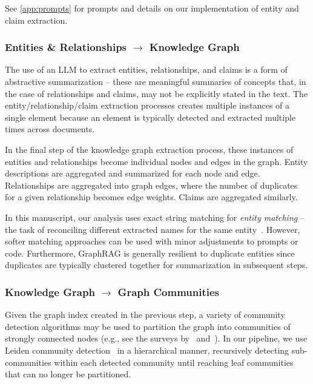 \documentclass{article}
\begin{document}
See \autoref{app:prompts} for prompts and details on our implementation of entity and claim extraction.

\subsubsection{Entities \& Relationships \texorpdfstring{$\rightarrow$}{-->} Knowledge Graph}
The use of an LLM to extract entities, relationships, and claims is a form of abstractive summarization -- these are meaningful summaries of concepts that, in the case of relationships and claims, may not be explicitly stated in the text.
The entity/relationship/claim extraction processes creates multiple instances of a single element because an element is typically detected and extracted multiple times across documents.

In the final step of the knowledge graph extraction process, these instances of entities and relationships become individual nodes and edges in the graph.
Entity descriptions are aggregated and summarized for each node and edge.
Relationships are aggregated into graph edges, where the number of duplicates for a given relationship becomes edge weights.
Claims are aggregated similarly.

In this manuscript, our analysis uses exact string matching for \emph{entity matching} -- the task of reconciling different extracted names for the same entity~\citep{barlaug2021neural, christen2012data, elmagarmid2006duplicate}. 
However, softer matching approaches can be used with minor adjustments to prompts or code.
Furthermore, GraphRAG is generally resilient to duplicate entities since duplicates are typically clustered together for summarization in subsequent steps.

\subsubsection{Knowledge Graph \texorpdfstring{$\rightarrow$}{-->} Graph Communities}

Given the graph index created in the previous step, a variety of community detection algorithms may be used to partition the graph into communities of strongly connected nodes (e.g., see the surveys by~\citet{fortunato2010community} and~\citet{jin2021survey}).
In our pipeline, we use Leiden community detection~\citep{Traag2019Leiden} in a hierarchical manner, recursively detecting sub-communities within each detected community until reaching leaf communities that can no longer be partitioned. 
\end{document}

